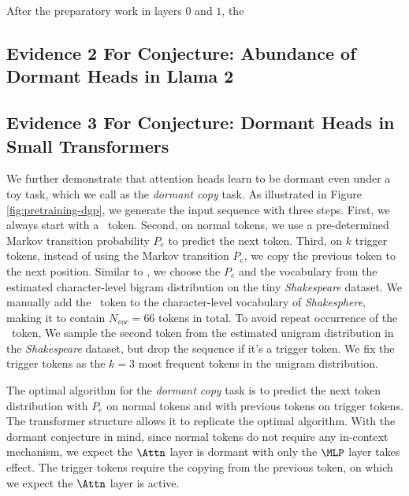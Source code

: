 After the preparatory work in layers $0$ and $1$, the


\subsection{Evidence 2 For Conjecture: Abundance of Dormant Heads in Llama 2} \label{sub:lots_of_dormant_heads}


\subsection{Evidence 3 For Conjecture: Dormant Heads in Small Transformers} \label{sub:controlled_experiments}

We further demonstrate that attention heads learn to be dormant even under a toy task, which we call as the \textit{dormant copy} task. As illustrated in Figure \ref{fig:pretraining-dgp}, we generate the input sequence with three steps. First, we always start with a \bos~token. Second, on normal tokens, we use a pre-determined Markov transition probability $P_e$ to predict the next token. Third, on $k$ trigger tokens, instead of using the Markov transition $P_e$, we copy the previous token to the next position. Similar to \citet{bietti2024birth}, we choose the $P_e$ and the vocabulary from the estimated character-level bigram distribution on the tiny \textit{Shakespeare} dataset. We manually add the \bos~token to the character-level vocabulary of \textit{Shakesphere}, making it to contain $N_{voc}=66$ tokens in total. 
To avoid repeat occurrence of the \bos~token, We sample the second token from the estimated unigram distribution in the \textit{Shakespeare} dataset, but drop the sequence if it's a trigger token. We fix the trigger tokens as the $k=3$ most frequent tokens in the unigram distribution.

The optimal algorithm for the \textit{dormant copy} task is to predict the next token distribution with $P_e$ on normal tokens and with previous tokens on trigger tokens. The transformer structure allows it to replicate the optimal algorithm. With the dormant conjecture in mind, since normal tokens do not require any in-context mechanism, we expect the $\Attn$ layer is dormant with only the $\MLP$ layer takes effect. The trigger tokens require the copying from the previous token, on which we expect the $\Attn$ layer is active. 

